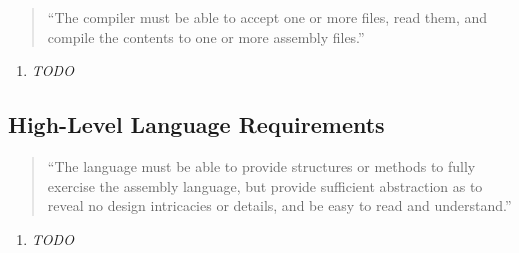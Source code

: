 \documentclass{article}
\begin{document}
\begin{quote}
    ``The compiler must be able to accept one or more files, read them, and compile the contents to one or more assembly files.''
\end{quote}

\begin{enumerate}[label=R\arabic*]
    \item \textit{TODO}
\end{enumerate}

\subsection{High-Level Language Requirements}

\begin{quote}
    ``The language must be able to provide structures or methods to fully exercise the assembly language, but provide sufficient abstraction as to reveal no design intricacies or details, and be easy to read and understand.''
\end{quote}

\begin{enumerate}[label=R\arabic*]
    \item \textit{TODO}
\end{enumerate}
\end{document}
